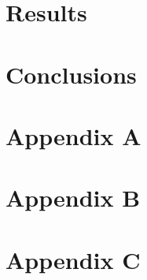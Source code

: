 \documentclass[oneside,openright,titlepage,numbers=noenddot,headinclude,footinclude=true,cleardoublepage=empty,listof=totoc,paper=a4,fontsize=11pt,american,BCOR=5mm]{scrreprt}
\begin{document}
  \chapter{Results}\label{c:Results}
  
  \newpage
  
  \chapter{Conclusions}\label{c:Conclusions}
  
  \newpage
  
  \chapter{Appendix A}\label{c:AppendixA}
  
  \newpage

  \chapter{Appendix B}\label{c:AppendixB}
  
  \newpage

  \chapter{Appendix C}\label{c:AppendixC}
  
  \newpage

  
  \cleardoublepage
  \appendix

  
  \singlespacing
  
  \cleardoublepage

  \newpage
  
  
  \pagestyle{empty}
  \onehalfspacing
  
\end{document}
